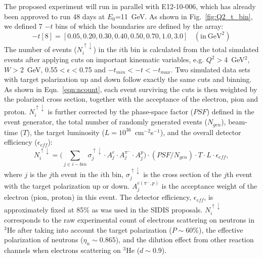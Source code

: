 The proposed experiment will run in parallel with E12-10-006, which has already
been approved to run 48 days at $E_{0}$=11~GeV.  As shown in
Fig.~\ref{fig:Q2_t_bin}, we defined 7 $-t$ bins of which the boundaries are
defined by the array:
 \begin{equation}
-t[8] = [0.05, 0.20, 0.30, 0.40, 0.50, 0.70, 1.0, 3.0]~~~~(\mathrm{in~GeV^{2}})
 \end{equation}
The number of events ($N^{\uparrow\downarrow}_{i}$) in the $i$th bin is
calculated from the total simulated events after applying cuts on important
kinematic variables, e.g. $Q^{2}>$4~GeV$^{2}$, $W>$2~GeV, 0.55$<\epsilon<$0.75
and $-t_{min}<-t<-t_{max}$. Two simulated data sets with target polarization up
and down follow exactly the same cuts and binning.  As shown in
Eqn.~\ref{eqn:ncount}, each event surviving the cuts is then weighted by the
polarized cross section, together with the acceptance of the electron, pion and
proton. $N^{\uparrow\downarrow}_{i}$ is further corrected by the phase-space
factor ($PSF$) defined in the event generator, the total number of randomly
generated events ($N_{gen}$), beam-time ($T$), the target luminosity
($L=10^{36}$~cm$^{-2}$s$^{-1}$), and the overall detector efficiency
($\epsilon_{eff}$):
 \begin{equation}
     N^{\uparrow\downarrow}_{i} = \bigl(\sum_{j\in i-bin}
     \sigma^{\uparrow\downarrow}_{j}\cdot A^{e}_{j} \cdot
     A^{\pi^{-}}_{j} \cdot A^{p}_{j}\bigr) \cdot (PSF/N_{gen}) \cdot T \cdot L
     \cdot \epsilon_{eff},
     \label{eqn:ncount}
 \end{equation}
where $j$ is the $j$th event in the $i$th bin,
$\sigma^{\uparrow\downarrow}_{j}$ is the cross section of the $j$th event with
the target polarization up or down. $A^{e(\pi^{-},p)}_{j}$ is the acceptance
weight of the electron (pion, proton) in this event. The detector efficiency,
$\epsilon_{eff}$, is approximately fixed at 85\% as was used in the SIDIS
proposals. $N^{\uparrow\downarrow}_{i}$ corresponds to the raw experimental
count of electrons scattering on neutrons in $\mathrm{^{3}He}$ after taking
into account the target polarization ($P\sim60\%$), the effective polarization
of neutrons ($\eta_{n}\sim0.865$), and the dilution effect from other reaction
channels when electrons scattering on $\mathrm{^{3}He}$ ($d \sim 0.9$).


